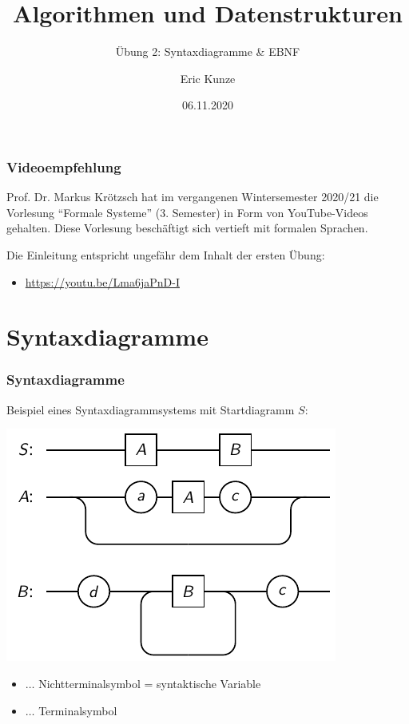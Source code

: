 \documentclass{beamer}
\begin{document}
	
	\title{Algorithmen und Datenstrukturen}
	\subtitle{Übung 2: Syntaxdiagramme \& EBNF}
	\author{Eric Kunze}
	\date{06.11.2020}

	\maketitle



\begin{frame} \frametitle{Videoempfehlung}
	
	
	Prof. Dr. Markus Krötzsch hat im vergangenen Wintersemester 2020/21 die Vorlesung \enquote{Formale Systeme} (3. Semester) in Form von YouTube-Videos gehalten. Diese Vorlesung beschäftigt sich vertieft mit formalen Sprachen.
	
	Die Einleitung entspricht ungefähr dem Inhalt der ersten Übung:
	\begin{itemize}
		\item  \url{https://youtu.be/Lma6jaPnD-I}
	\end{itemize}
\end{frame}

\section{Syntaxdiagramme}

\begin{frame} \frametitle{Syntaxdiagramme}
	\small
	Beispiel eines Syntaxdiagrammsystems mit Startdiagramm $S$:
	\begin{center}
		\includegraphics[width=.5\textwidth]{tut02_syntax-dia-bsp.pdf}
	\end{center}
	\begin{itemize}
		\item[]  $\dots$
		Nichtterminalsymbol = syntaktische Variable
		\item[]  $\dots$
		Terminalsymbol
	\end{itemize}
\end{frame}
\end{document}
